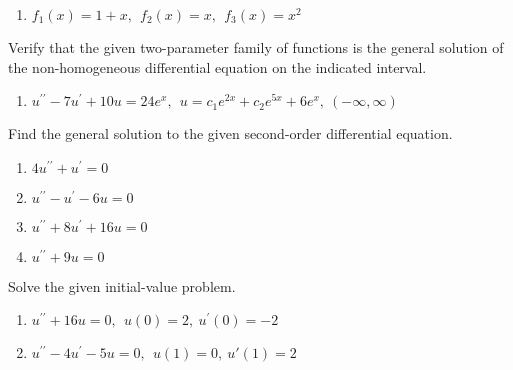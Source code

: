 \begin{fullwidth}
\begin{enumerate}[resume=outerlist]
\vspace{1.0cm}

\item $f_1(x)=1+x, \ \ f_2(x)=x, \ \ f_3(x)=x^2$
\vspace{1.0cm}
\end{enumerate}


\noindent Verify that the given two-parameter family of functions is the general solution of the non-homogeneous differential equation on the indicated interval.

\begin{enumerate}[resume]
\item $u^{\prime \prime}-7u^{\prime}+10u=24e^{x}, \ \ u=c_1e^{2x}+c_2e^{5x}+6e^{x}, \ \left(-\infty,\infty\right)$

\vspace{1.0cm} 

\end{enumerate}

\noindent Find the general solution to the given second-order differential equation.

\begin{enumerate}[resume]
\item $4u^{\prime \prime}+u^{\prime} = 0$

\vspace{1.0cm}

\item $u^{\prime \prime}-u^{\prime}-6u=0$

\vspace{1.0cm}

\item $u^{\prime \prime}+8u^{\prime}+16u=0$

\vspace{1.0cm}

\item $u^{\prime \prime}+9u=0$

\vspace{1.0cm}
\end{enumerate}


\noindent Solve the given initial-value problem.

\begin{enumerate}[resume]
\item $u^{\prime \prime}+16u=0, \ \ u(0)=2, \ u^{\prime}(0)=-2$

\vspace{1.0cm}

\item $u^{\prime \prime}-4u^{\prime}-5u=0, \ \ u(1)=0, \ u{\prime}(1)=2$


\end{enumerate}
\end{fullwidth}
